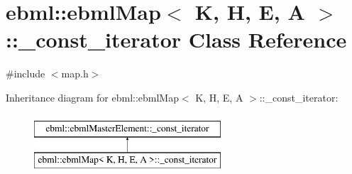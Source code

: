 \hypertarget{classebml_1_1ebmlMap_1_1__const__iterator}{}\section{ebml\+:\+:ebml\+Map$<$ K, H, E, A $>$\+:\+:\+\_\+const\+\_\+iterator Class Reference}
\label{classebml_1_1ebmlMap_1_1__const__iterator}


{\ttfamily \#include $<$map.\+h$>$}

Inheritance diagram for ebml\+:\+:ebml\+Map$<$ K, H, E, A $>$\+:\+:\+\_\+const\+\_\+iterator\+:\begin{figure}[H]
\begin{center}
\leavevmode
\includegraphics[height=2.000000cm]{classebml_1_1ebmlMap_1_1__const__iterator}
\end{center}
\end{figure}
